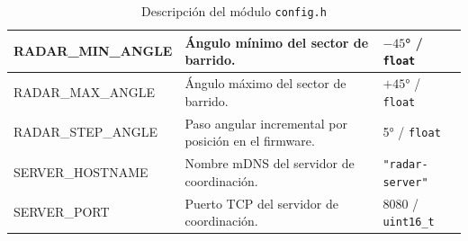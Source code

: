 \begin{table}[h!]
\begin{tabular}{|p{2.8cm}|p{5.8cm}|p{4.5cm}|}
\hline
RADAR\_MIN\_ANGLE & Ángulo mínimo del sector de barrido. & $-45$° / \texttt{float} \\
\hline
RADAR\_MAX\_ANGLE & Ángulo máximo del sector de barrido. & $+45$° / \texttt{float} \\
\hline
RADAR\_STEP\_ANGLE & Paso angular incremental por posición en el firmware. & 5° / \texttt{float} \\
\hline
SERVER\_HOSTNAME & Nombre mDNS del servidor de coordinación. & \texttt{"radar-server"} \\
\hline
SERVER\_PORT & Puerto TCP del servidor de coordinación. & 8080 / \texttt{uint16\_t} \\
\hline
\end{tabular}
\caption{Descripción del módulo \texttt{config.h}}
\label{tab:module_config}
\end{table}

